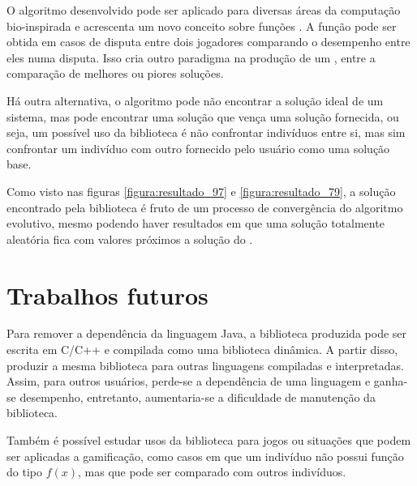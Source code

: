 O algoritmo desenvolvido pode ser aplicado para diversas áreas da computação bio-inspirada e acrescenta um novo conceito sobre funções \fitness. A função \fitness pode ser obtida em casos de disputa entre dois jogadores comparando o desempenho entre eles numa disputa. Isso cria outro paradigma na produção de um \SE, entre a comparação de melhores ou piores soluções.

Há outra alternativa, o algoritmo pode não encontrar a solução ideal de um sistema, mas pode encontrar uma solução que vença uma solução fornecida, ou seja, um possível uso da biblioteca é não confrontar indivíduos entre si, mas sim confrontar um indivíduo com outro fornecido pelo usuário como uma solução base.

Como visto nas figuras \ref{figura:resultado_97} e \ref{figura:resultado_79}, a solução encontrado pela biblioteca é fruto de um processo de convergência do algoritmo evolutivo, mesmo podendo haver resultados em que uma solução totalmente aleatória fica com valores próximos a solução do \SE.

\section{Trabalhos futuros}

Para remover a dependência da linguagem Java, a biblioteca produzida pode ser escrita em C/C++ e compilada como uma biblioteca dinâmica. A partir disso, produzir a mesma biblioteca para outras linguagens compiladas e interpretadas. Assim, para outros usuários, perde-se a dependência de uma linguagem e ganha-se desempenho, entretanto, aumentaria-se a dificuldade de manutenção da biblioteca.

Também é possível estudar usos da biblioteca para jogos ou situações que podem ser aplicadas a gamificação, como casos em que um indivíduo não possui função \fitness do tipo $f(x)$, mas que pode ser comparado com outros indivíduos.